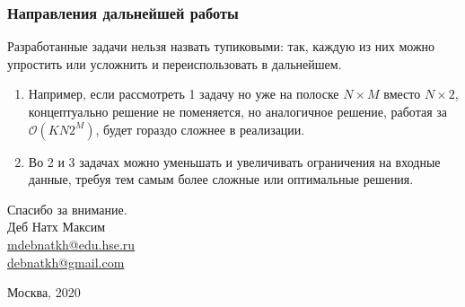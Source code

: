 \documentclass{beamer}
\begin{document}
\begin{frame}
\frametitle{Направления дальнейшей работы}
Разработанные задачи нельзя назвать тупиковыми: так, каждую из них можно упростить или усложнить и переиспользовать в дальнейшем.
\begin{enumerate}
\item Например, если рассмотреть 1 задачу но уже на полоске $N \times M$ вместо $N \times 2$, концептуально решение не поменяется, но аналогичное решение, работая за $\mathcal O(KN2^M)$, будет гораздо сложнее в реализации.
\item Во 2 и 3 задачах можно уменьшать и увеличивать ограничения на входные данные, требуя тем самым более сложные или оптимальные решения.
\end{enumerate}

\end{frame}








\begin{frame}
\begin{center}
{\LARGE Спасибо за внимание.} \\
\bigskip
Деб Натх Максим \\\smallskip \scriptsize \url{mdebnatkh@edu.hse.ru}\\\url{debnatkh@gmail.com}

\bigskip
\scriptsize{Москва, 2020}
    \end{center}
\end{frame}
\end{document}
